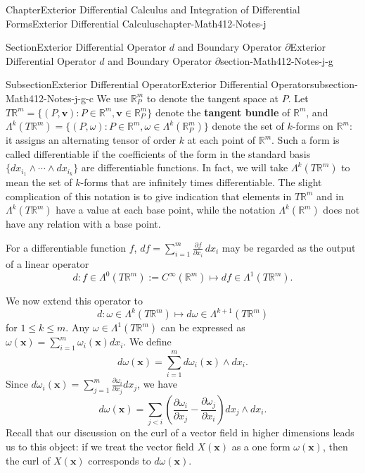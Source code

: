 \documentclass[oneside,10pt,]{book}
\newcommand{\terminology}[1]{\textbf{#1}}
\numberwithin{equation}{section}
\newcommand{\bv}{\mathbf{v}}
\newcommand{\bx}{\mathbf{x}}
\newcommand{\bbR}{\mathbb{R}}
\begin{document}
\begin{chapterptx}{Chapter}{Exterior Differential Calculus and Integration of Differential Forms}{}{Exterior Differential Calculus}{}{}{chapter-Math412-Notes-j}
\begin{sectionptx}{Section}{Exterior Differential Operator \(d\) and Boundary Operator \(\partial\)}{}{Exterior Differential Operator \(d\) and Boundary Operator \(\partial\)}{}{}{section-Math412-Notes-j-g}
\begin{subsectionptx}{Subsection}{Exterior Differential Operator}{}{Exterior Differential Operator}{}{}{subsection-Math412-Notes-j-g-c}
We use \(\bbR^{m}_{P}\) to denote the tangent space at \(P\). Let \(T\bbR^{m}=\{(P, \bv): P\in \bbR^{m}, \bv\in \bbR^{m}_{P}\}\) denote the \terminology{tangent bundle} of \(\bbR^{m}\), and \(\Lambda^{k}(T\bbR^{m})=\{ (P, \omega): P\in \bbR^{m}, \omega \in \Lambda^{k}(\bbR^{m}_{P})\}\)  denote the set of \(k\)-forms on \(\bbR^{m}\): it assigns an alternating tensor of order \(k\) at each point of \(\bbR^{m}\). Such a form is called differentiable if the coefficients of the form in the standard basis \(\{dx_{i_{1}}\wedge \cdots \wedge dx_{i_{k}}\}\) are differentiable functions. In fact, we will take \(\Lambda^{k}(T\bbR^{m})\) to mean the set of \(k\)-forms that are infinitely times differentiable. The slight complication of this notation is to give indication that elements in \(T\bbR^{m}\) and in \(\Lambda^{k}(T\bbR^{m})\) have a value at each base point, while the notation \(\Lambda^{k}(\bbR^{m})\) does not have any relation with a base point.%
\par
For a differentiable function \(f\), \(df=\sum_{i=1}^{m} \frac{\partial f}{\partial x_{i}}\, dx_{i}\) may be regarded as the output of a linear operator%
\begin{equation*}
d: f\in \Lambda^{0}(T\bbR^{m}):=C^{\infty}(\bbR^{m})\mapsto df\in \Lambda^{1}(T\bbR^{m}).
\end{equation*}
%
\par
We now extend this operator to%
\begin{equation*}
d: \omega \in \Lambda^{k}(T\bbR^{m})\mapsto d\omega \in \Lambda^{k+1}(T\bbR^{m})
\end{equation*}
for \(1\le k\le m\). Any \(\omega\in \Lambda^{1}(T\bbR^{m})\) can be expressed as \(\omega(\bx)=\sum_{i=1}^{m}\omega_{i}(\bx)dx_{i}\). We define%
\begin{equation*}
d\omega(\bx)=\sum_{i=1}^{m}d \omega_{i}(\bx)\wedge dx_{i}.
\end{equation*}
Since \(d \omega_{i}(\bx) =\sum_{j=1}^{m}\frac{\partial \omega_{i}}{\partial x_{j}}dx_{j}\), we have%
\begin{equation*}
d\omega(\bx)=\sum_{j < i}  
\left( \frac{\partial \omega_{i}}{\partial x_j} -  \frac{\partial \omega_{j}}{\partial x_{i}} \right) 
dx_{j} \wedge dx_{i}.
\end{equation*}
Recall that our discussion on the curl of a vector field in higher dimensions leads us to this object: if we treat the vector field \(X(\bx)\) as a one form \(\omega(\bx)\), then the curl of \(X(\bx)\) corresponds	to \(d\omega(\bx)\).%
\par

\end{subsectionptx}
\end{sectionptx}
\end{chapterptx}
\end{document}

